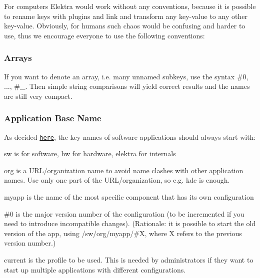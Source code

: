 For computers Elektra would work without any conventions, because it is possible to rename keys with plugins and link and transform any key-\/value to any other key-\/value. Obviously, for humans such chaos would be confusing and harder to use, thus we encourage everyone to use the following conventions\+:

\subsubsection*{Arrays}

If you want to denote an array, i.\+e. many unnamed subkeys, use the syntax {\ttfamily \#0}, ..., {\ttfamily \#\+\_}. Then simple string comparisons will yield correct results and the names are still very compact.

\subsubsection*{Application Base Name}

As decided \href{https://github.com/ElektraInitiative/libelektra/issues/302}{\tt here}, the key names of software-\/applications should always start with\+: 



\begin{DoxyItemize}
\item {\ttfamily sw} is for software, {\ttfamily hw} for hardware, {\ttfamily elektra} for internals
\item {\ttfamily org} is a U\+R\+L/organization name to avoid name clashes with other application names. Use only one part of the U\+R\+L/organization, so e.\+g. {\ttfamily kde} is enough.
\item {\ttfamily myapp} is the name of the most specific component that has its own configuration
\item {\ttfamily \#0} is the major version number of the configuration (to be incremented if you need to introduce incompatible changes). (Rationale\+: it is possible to start the old version of the app, using {\ttfamily /sw/org/myapp/\#X}, where {\ttfamily X} refers to the previous version number.)
\item {\ttfamily current} is the profile to be used. This is needed by administrators if they want to start up multiple applications with different configurations.
\end{DoxyItemize}

